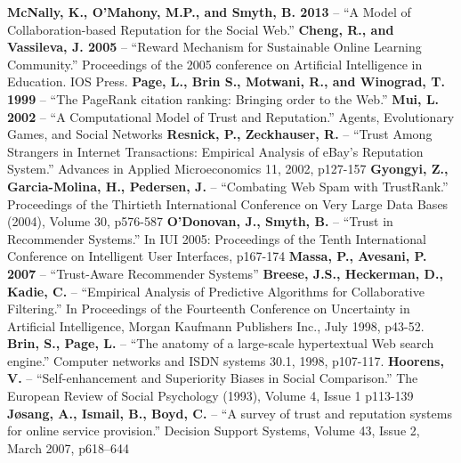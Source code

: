 \documentclass[]{final_report}
\begin{document}
\newpage
\raggedright
\textbf{McNally, K., O'Mahony, M.P., and Smyth, B. 2013} -- ``A Model of Collaboration-based Reputation for the Social Web.''
\linebreak
\linebreak
\textbf{Cheng, R., and Vassileva, J. 2005} -- ``Reward Mechanism for Sustainable Online Learning Community.'' Proceedings of the 2005 conference on Artificial Intelligence in Education. IOS Press.
\linebreak
\linebreak
\textbf{Page, L., Brin S., Motwani, R., and Winograd, T. 1999} -- ``The PageRank citation ranking: Bringing order to the Web.''
\linebreak
\linebreak
\textbf{Mui, L. 2002} -- ``A Computational Model of Trust and Reputation.'' Agents, Evolutionary Games, and Social Networks
\linebreak
\linebreak
\textbf{Resnick, P., Zeckhauser, R.} -- ``Trust Among Strangers in Internet Transactions: Empirical Analysis of eBay's Reputation System.'' Advances in Applied Microeconomics 11, 2002, p127-157
\linebreak
\linebreak
\textbf{Gyongyi, Z., Garcia-Molina, H., Pedersen, J.} -- ``Combating Web Spam with TrustRank.'' Proceedings of the Thirtieth International Conference on Very Large Data Bases (2004), Volume 30, p576-587
\linebreak
\linebreak
\textbf{O'Donovan, J., Smyth, B.} -- ``Trust in Recommender Systems.'' In IUI 2005: Proceedings of the Tenth International Conference on Intelligent User Interfaces, p167-174
\linebreak
\linebreak
\textbf{Massa, P., Avesani, P. 2007} -- ``Trust-Aware Recommender Systems''
\linebreak
\linebreak
\textbf{Breese, J.S., Heckerman, D., Kadie, C.} -- ``Empirical Analysis of Predictive Algorithms for Collaborative Filtering.'' In Proceedings of the Fourteenth Conference on Uncertainty in Artificial Intelligence, Morgan Kaufmann Publishers Inc., July 1998, p43-52.
\linebreak
\linebreak
\textbf{Brin, S., Page, L.} -- ``The anatomy of a large-scale hypertextual Web search engine.'' Computer networks and ISDN systems 30.1, 1998, p107-117.
\linebreak
\linebreak
\textbf{Hoorens, V.} -- ``Self-enhancement and Superiority Biases in Social Comparison.'' The European Review of Social Psychology (1993), Volume 4, Issue 1 p113-139
\linebreak
\linebreak
\textbf{Jøsang, A., Ismail, B., Boyd, C.} -- ``A survey of trust and reputation systems for online service provision.'' Decision Support Systems, Volume 43, Issue 2, March 2007, p618–644



\label{endpage}
\end{document}
